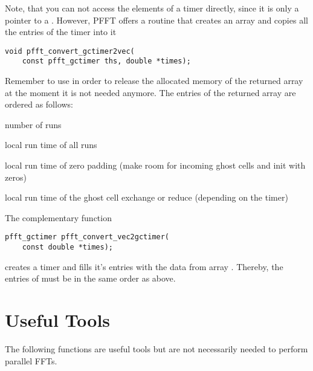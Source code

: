 Note, that you can not access the elements of a timer directly, since it is only a pointer to a .
However, PFFT offers a routine that creates an array and copies all the entries of the timer into it
\begin{lstlisting}
void pfft_convert_gctimer2vec(
    const pfft_gctimer ths, double *times);
\end{lstlisting}
Remember to use  in order to release the allocated memory of the returned array at the moment it is not needed anymore.
The entries of the returned array are ordered as follows:
\begin{compactitem}
  \item number of  runs 
  \item local run time of all runs
  \item local run time of zero padding (make room for incoming ghost cells and init with zeros)
  \item local run time of the ghost cell exchange or reduce (depending on the timer)
\end{compactitem}
The complementary function
\begin{lstlisting}
pfft_gctimer pfft_convert_vec2gctimer(
    const double *times);
\end{lstlisting}
creates a timer and fills it's entries with the data from array . Thereby, the entries of 
must be in the same order as above. 



\section{Useful Tools}
The following functions are useful tools but are not necessarily needed to perform parallel FFTs.

